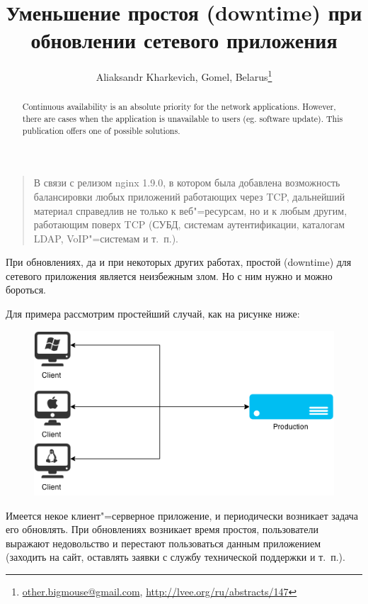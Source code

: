 \documentclass[10pt, a5paper]{article}
\begin{document}
\title{Уменьшение простоя (downtime) при обновлении сетевого приложения}
\author{Aliaksandr Kharkevich, Gomel, Belarus\footnote{\url{other.bigmouse@gmail.com}, \url{http://lvee.org/ru/abstracts/147}}}
\maketitle
\begin{abstract}
Continuous availability is an absolute priority for the network applications. However, there are cases when the application is unavailable to users (eg. software update). 
This publication offers one of possible solutions.
\end{abstract}
\begin{quotation}
В связи с релизом nginx 1.9.0, в котором была добавлена возможность балансировки любых приложений работающих через TCP, дальнейший материал справедлив не только к веб"=ресурсам, но и к любым другим, работающим поверх TCP (СУБД, системам аутентификации, каталогам LDAP, VoIP"=системам и т.~п.).
\end{quotation}

При обновлениях, да и при некоторых других работах, простой (downtime) для сетевого приложения является неизбежным злом. Но с ним нужно и можно бороться.

Для примера рассмотрим простейший случай, как на рисунке ниже:

\begin{figure}[h!]
  \centering
  \includegraphics[scale=0.36]{02_2015_01_example}
\end{figure}


Имеется некое клиент"=серверное приложение, и периодически возникает задача его обновлять. При обновлениях возникает время простоя, пользователи выражают недовольство и перестают пользоваться данным приложением (заходить на сайт, оставлять заявки с службу технической поддержки и т.~п.).
\end{document}
